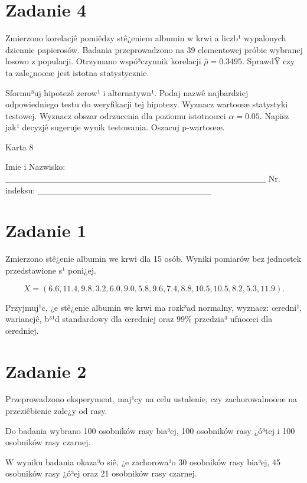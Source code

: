 \documentclass[a4paper,12pt]{article}
\begin{document}
  \section*{Zadanie 4}
     
     Zmierzono korelacjê pomiêdzy stê¿eniem albumin w krwi a liczb¹ wypalonych dziennie papierosów. 
     Badania przeprowadzono na 39 elementowej próbie wybranej losowo z populacji. 
     Otrzymano wspó³czynnik korelacji $\hat\rho = 0.3495 $. 
     SprawdŸ czy ta zale¿noœæ jest istotna statystycznie. 
     
     Sformu³uj hipotezê zerow¹ i alternatywn¹. 
     Podaj nazwê najbardziej odpowiedniego testu do weryfikacji tej hipotezy. 
     Wyznacz wartoœæ statystyki testowej. 
     Wyznacz obszar odrzucenia dla poziomu istotnoœci $\alpha=0.05$. 
     Napisz jak¹ decyzjê sugeruje wynik testowania. 
     Oszacuj p-wartoœæ. \vspace{1cm} 

  \clearpage  Karta  8  

 Imie i Nazwisko: \_\_\_\_\_\_\_\_\_\_\_\_\_\_\_\_\_\_\_\_\_\_\_\_\_\_\_\_\_\_\_\_\_\_\_\_\_\_\_\_\_\_ Nr. indeksu: \_\_\_\_\_\_\_\_\_\_\_\_\_\_\_\_\_\_\_\_\_\_\_\_\_\_\_\_ 
 \section*{Zadanie 1}
     
     Zmierzono stê¿enie albumin we krwi dla 15 osób. 
     Wyniki pomiarów bez jednostek przedstawione s¹ poni¿ej. 
     
     \noindent $$X=(  6.6, 11.4,  9.8,  3.2,  6.0,  9.0,  5.8,  9.6,  7.4,  8.8, 10.5, 10.5,  8.2,  5.3, 11.9 ).$$
     
     Przyjmuj¹c, ¿e stê¿enie albumin we krwi ma rozk³ad normalny, 
     wyznacz: œredni¹, wariancjê, b³¹d standardowy dla œredniej oraz 99\% przedzia³ ufnoœci dla œredniej. \vspace{1cm} 

  \section*{Zadanie 2}
     
  Przeprowadzono eksperyment, maj¹cy na celu ustalenie, czy zachorowalnoœæ na przeziêbienie zale¿y od rasy.
  
  Do badania wybrano 100 osobników rasy bia³ej, 100 osobników rasy ¿ó³tej i 100 osobników rasy czarnej. 
  
  W wyniku badania okaza³o siê, ¿e zachorowa³o 30 osobników rasy bia³ej, 45 osobników rasy ¿ó³ej oraz 21 osobników rasy czarnej. 
  
\end{document}
